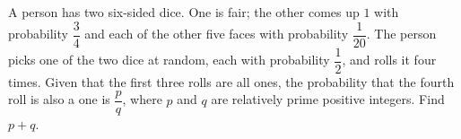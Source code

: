 A person has two six-sided dice. One is fair; the other comes up $1$ with probability $\dfrac34$ and each of the other five faces with probability $\dfrac{1}{20}$. The person picks one of the two dice at random, each with probability $\dfrac12$, and rolls it four times. Given that the first three rolls are all ones, the probability that the fourth roll is also a one is $\dfrac pq$, where $p$ and $q$ are relatively prime positive integers. Find $p+q$.
